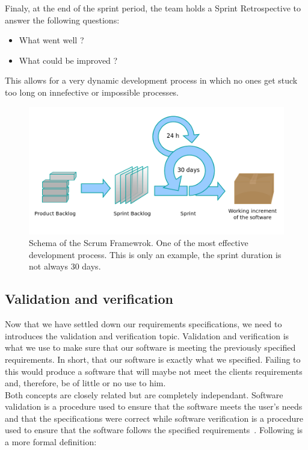 \documentclass[12pt]{article}
\begin{document}
Finaly, at the end of the sprint period, the team holds a Sprint Retrospective to answer the following questions:

\begin{itemize}

\item What went well ?
\item What could be improved ?

\end{itemize}

This allows for a very dynamic development process in which no ones get stuck too long on innefective or impossible processes.

\begin{figure}
    \centering
    \includegraphics[scale=0.4]{scrum.png}
    \caption{Schema of the Scrum Framewrok. One of the most effective development process. This is only an example, the sprint duration is not always 30 days.}
    \label{Scrum}
\end{figure}

\subsection{Validation and verification}

Now that we have settled down our requirements specifications, we need to introduces the validation and verification topic. Validation and verification is what we use to make sure that our software is meeting the previously specified requirements. In short, that our software is exactly what we specified. Failing to this would produce a software that will maybe not meet the clients requirements and, therefore, be of little or no use to him.\\

Both concepts are closely related but are completely independant. Software validation is a procedure used to ensure that the software meets the user's needs and that the specifications were correct while software verification is a procedure used to ensure that the software follows the specified requirements~\cite{VnV:2016}. Following is a more formal definition:
\end{document}
